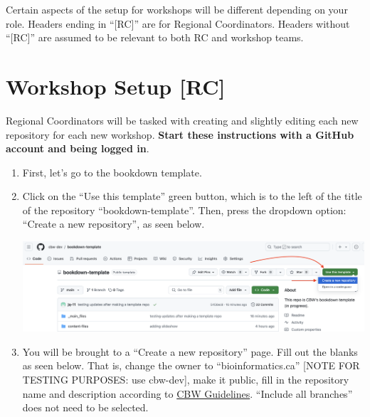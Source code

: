 \documentclass[
]{book}
\theoremstyle{definition}
\theoremstyle{definition}
\theoremstyle{definition}
\theoremstyle{definition}
\theoremstyle{remark}
\begin{document}
Certain aspects of the setup for workshops will be different depending on your role. Headers ending in ``{[}RC{]}'' are for Regional Coordinators. Headers without ``{[}RC{]}'' are assumed to be relevant to both RC and workshop teams.

\section{Workshop Setup {[}RC{]}}\label{rc-workshop-setup}

Regional Coordinators will be tasked with creating and slightly editing each new repository for each new workshop. \textbf{Start these instructions with a GitHub account and being logged in}.

\begin{enumerate}
\def\labelenumi{\arabic{enumi}.}
\item
  First, let's go to the bookdown template.
\item
  Click on the ``Use this template'' green button, which is to the left of the title of the repository ``bookdown-template''. Then, press the dropdown option: ``Create a new repository'', as seen below.

  \includegraphics{img/template/make-a-template.png}\\
\item
  You will be brought to a ``Create a new repository'' page. Fill out the blanks as seen below. That is, change the owner to ``bioinformatics.ca'' {[}NOTE FOR TESTING PURPOSES: use cbw-dev{]}, make it public, fill in the repository name and description according to \href{}{CBW Guidelines}. ``Include all branches'' does not need to be selected.


\end{enumerate}
\end{document}
